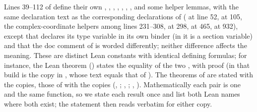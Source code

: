 \begin{remark}\label{oc:rem:copies}
Lines 39--112 of  define their own , ,
, , , , ,  and some
helper lemmas, with the same declaration text as the corresponding declarations of
 ( at line 52,  at 105, the
complex-coordinate helpers among lines 231--308,  at 298,  at
465,  at 932), except that  declares its type variable in its own binder
(in  it is a section variable) and that the doc comment of  is
worded differently; neither difference affects the meaning. These are distinct Lean constants with identical
defining formulas; for instance, the Lean theorem 
() states the equality of the two , with proof
 (in that build  is the copy in
, whose text equals that of
). The theorems of  are stated with the
 copies, those of  with the  copies
(, ;
, ;
, ). Mathematically each pair
is one and the same function, so we state each result once and list both Lean names where both exist;
the statement then reads verbatim for either copy.
\end{remark}

